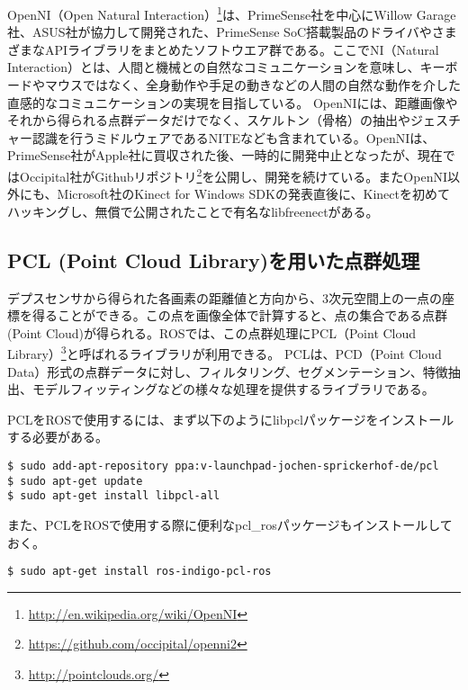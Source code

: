 OpenNI（Open Natural Interaction）\footnote{\url{http://en.wikipedia.org/wiki/OpenNI}}は、PrimeSense社を中心にWillow Garage社、ASUS社が協力して開発された、PrimeSense SoC搭載製品のドライバやさまざまなAPIライブラリをまとめたソフトウエア群である。ここでNI（Natural Interaction）とは、人間と機械との自然なコミュニケーションを意味し、キーボードやマウスではなく、全身動作や手足の動きなどの人間の自然な動作を介した直感的なコミュニケーションの実現を目指している。
OpenNIには、距離画像やそれから得られる点群データだけでなく、スケルトン（骨格）の抽出やジェスチャー認識を行うミドルウェアであるNITEなども含まれている。OpenNIは、PrimeSense社がApple社に買収された後、一時的に開発中止となったが、現在ではOccipital社がGithubリポジトリ\footnote{\url{https://github.com/occipital/openni2}}を公開し、開発を続けている。またOpenNI以外にも、Microsoft社のKinect for Windows SDKの発表直後に、Kinectを初めてハッキングし、無償で公開されたことで有名なlibfreenectがある。

\subsection{PCL (Point Cloud Library)を用いた点群処理}

デプスセンサから得られた各画素の距離値と方向から、3次元空間上の一点の座標を得ることができる。この点を画像全体で計算すると、点の集合である点群(Point Cloud)が得られる。ROSでは、この点群処理にPCL（Point Cloud Library）\footnote{\url{http://pointclouds.org/}}と呼ばれるライブラリが利用できる。
PCLは、PCD（Point Cloud Data）形式の点群データに対し、フィルタリング、セグメンテーション、特徴抽出、モデルフィッティングなどの様々な処理を提供するライブラリである。

PCLをROSで使用するには、まず以下のようにlibpclパッケージをインストールする必要がある。

\begin{lstlisting}[language=ROS]
$ sudo add-apt-repository ppa:v-launchpad-jochen-sprickerhof-de/pcl
$ sudo apt-get update
$ sudo apt-get install libpcl-all
\end{lstlisting}

また、PCLをROSで使用する際に便利なpcl\_rosパッケージもインストールしておく。

\begin{lstlisting}[language=ROS]
$ sudo apt-get install ros-indigo-pcl-ros
\end{lstlisting}


